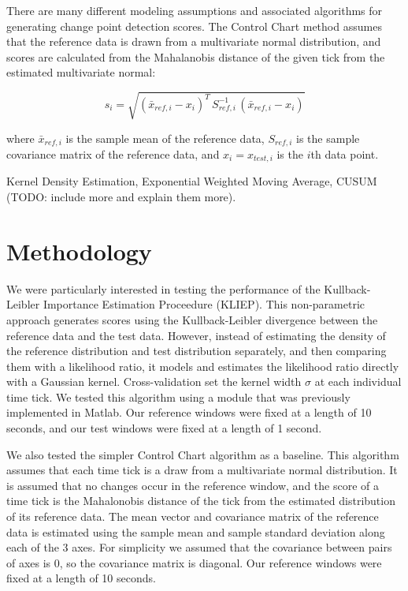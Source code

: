 There are many different modeling assumptions and associated algorithms
for generating change point detection scores. The Control Chart
method assumes that the reference data is drawn from a
multivariate normal distribution, and scores are calculated from the Mahalanobis
distance of the given tick from the estimated multivariate normal:

\[
s_i = \sqrt{(\bar{x}_{ref,i} - x_i)^T \, S_{ref,i}^{-1} \, (\bar{x}_{ref,i} - x_i)}
\]

where $\bar{x}_{ref,i}$ is the sample mean of the reference data, $S_{ref,i}$
is the sample covariance matrix of the reference data, and $x_i=x_{test,i}$ is
the $i$th data point.



Kernel Density Estimation,
Exponential Weighted Moving Average, CUSUM
(TODO: include more and explain them more).

\section{Methodology}
We were particularly interested in testing the performance of the
Kullback-Leibler Importance Estimation Proceedure (KLIEP).
This non-parametric approach generates scores using the Kullback-Leibler
divergence between the reference data and the test data. However, instead of
estimating the density of the reference distribution and test distribution
separately, and then comparing them with a likelihood ratio, it models and
estimates the likelihood ratio directly with a Gaussian kernel. Cross-validation 
set the kernel width $\sigma$ at each individual time tick.
We tested this algorithm using a module that was previously implemented in Matlab.
Our reference windows were fixed at a length of 10 seconds, and our test
windows were fixed at a length of 1 second.

We also tested the simpler Control Chart algorithm as a baseline. This
algorithm assumes that each time tick is a draw from a multivariate normal distribution.
It is assumed that no changes occur in the reference window, and the score of a time
tick is the Mahalonobis distance of the tick from the estimated distribution of its reference data.
The mean vector and covariance matrix of the reference data is estimated using
the sample mean and sample standard deviation along each of the 3 axes. For simplicity
we assumed that the covariance between pairs of axes is 0, so the covariance matrix is
diagonal. Our reference windows were fixed at a length of 10 seconds. 

